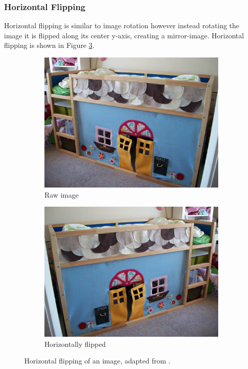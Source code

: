 \documentclass[10pt,twocolumn,letterpaper]{article}
\begin{document}
\subsubsection*{Horizontal Flipping}

Horizontal flipping is similar to image rotation however instead rotating the image it is flipped along its center y-axis, creating a mirror-image. Horizontal flipping is shown in Figure \ref{fig:horiz}.

\begin{figure}[!htbp]
  \centering
  \begin{subfigure}[b]{0.4\columnwidth}
    \centering
    \includegraphics[width=\linewidth]{Figures/FlipRaw.jpg}
    \caption{Raw image}
    \label{fig:short-a}
  \end{subfigure}
\hspace{0.01\textwidth}
  \begin{subfigure}[b]{0.4\columnwidth}
\centering
    \includegraphics[width=\linewidth]{Figures/FlipHoriz.jpg}
    \caption{Horizontally flipped}
    \label{fig:short-b}
  \end{subfigure}
  \caption{Horizontal flipping of an image, adapted from \cite{OfficeHome}.}
  \label{fig:horiz}
\end{figure}
\end{document}
